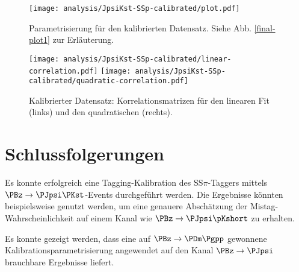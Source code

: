 \begin{figure}
  \texttt{[image: analysis/JpsiKst-SSp-calibrated/plot.pdf]}
  \caption{Parametrisierung für den kalibrierten Datensatz. Siehe Abb. \ref{final-plot1} zur Erläuterung.}
\end{figure}

\begin{figure}
  \texttt{[image: analysis/JpsiKst-SSp-calibrated/linear-correlation.pdf]}
  \texttt{[image: analysis/JpsiKst-SSp-calibrated/quadratic-correlation.pdf]}
  \caption{Kalibrierter Datensatz: Korrelationsmatrizen für den linearen Fit (links) und den quadratischen (rechts).}
\end{figure}

\section{Schlussfolgerungen}

Es konnte erfolgreich eine Tagging-Kalibration des SS$π$-Taggers mittels $\PBz \to \PJpsi\PKst$-Events durchgeführt werden.
Die Ergebnisse könnten beispielsweise genutzt werden, um eine genauere Abschätzung der Mistag-Wahrscheinlichkeit auf einem Kanal wie $\PBz \to \PJpsi\pKshort$ zu erhalten.

Es konnte gezeigt werden, dass eine auf $\PBz \to \PDm \Pgpp$ gewonnene Kalibrationsparametrisierung angewendet auf den Kanal $\PBz \to \PJpsi$ brauchbare Ergebnisse liefert.

